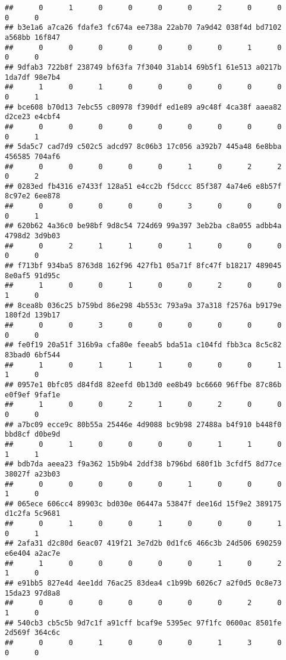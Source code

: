 \documentclass[
]{article}
\begin{document}
\begin{verbatim}
##      0      1      0      0      0      0      2      0      0      0      0 
## b3e1a6 a7ca26 fdafe3 fc674a ee738a 22ab70 7a9d42 038f4d bd7102 a568bb 16f847 
##      0      0      0      0      0      0      0      1      0      0      0 
## 9dfab3 722b8f 238749 bf63fa 7f3040 31ab14 69b5f1 61e513 a0217b 1da7df 98e7b4 
##      1      0      1      0      0      0      0      0      0      0      1 
## bce608 b70d13 7ebc55 c80978 f390df ed1e89 a9c48f 4ca38f aaea82 d2ce23 e4cbf4 
##      0      0      0      0      0      0      0      0      0      0      1 
## 5da5c7 cad7d9 c502c5 adcd97 8c06b3 17c056 a392b7 445a48 6e8bba 456585 704af6 
##      0      0      0      0      0      1      0      2      2      0      2 
## 0283ed fb4316 e7433f 128a51 e4cc2b f5dccc 85f387 4a74e6 e8b57f 8c97e2 6ee878 
##      0      0      0      0      0      3      0      0      0      0      1 
## 620b62 4a36c0 be98bf 9d8c54 724d69 99a397 3eb2ba c8a055 adbb4a 4798d2 3d9b03 
##      0      2      1      1      0      1      0      0      0      0      0 
## f713bf 934ba5 8763d8 162f96 427fb1 05a71f 8fc47f b18217 489045 8e0af5 91d95c 
##      1      0      0      1      0      0      2      0      0      1      0 
## 8cea8b 036c25 b759bd 86e298 4b553c 793a9a 37a318 f2576a b9179e 180f2d 139b17 
##      0      0      3      0      0      0      0      0      0      0      0 
## fe0f19 20a51f 316b9a cfa80e feeab5 bda51a c104fd fbb3ca 8c5c82 83bad0 6bf544 
##      1      0      1      1      1      0      0      0      1      1      0 
## 0957e1 0bfc05 d84fd8 82eefd 0b13d0 ee8b49 bc6660 96ffbe 87c86b e0f9ef 9faf1e 
##      1      0      0      2      1      0      2      0      0      0      0 
## a7bc09 ecce9c 80b55a 25446e 4d9088 bc9b98 27488a b4f910 b448f0 bbd8cf d0be9d 
##      0      1      0      0      0      0      1      1      0      1      1 
## bdb7da aeea23 f9a362 15b9b4 2ddf38 b796bd 680f1b 3cfdf5 8d77ce 38027f a23b03 
##      0      0      0      0      0      1      0      0      0      1      0 
## 065ece 606cc4 89903c bd030e 06447a 53847f dee16d 15f9e2 389175 d1c2fa 5c9681 
##      0      1      0      0      1      0      0      0      1      0      1 
## 2afa31 d2c80d 6eac07 419f21 3e7d2b 0d1fc6 466c3b 24d506 690259 e6e404 a2ac7e 
##      1      0      0      0      0      0      1      0      2      1      0 
## e91bb5 827e4d 4ee1dd 76ac25 83dea4 c1b99b 6026c7 a2f0d5 0c8e73 15da23 97d8a8 
##      0      0      0      0      0      0      0      2      0      1      0 
## 540cb3 cb5c5b 9d7c1f a91cff bcaf9e 5395ec 97f1fc 0600ac 8501fe 2d569f 364c6c 
##      0      0      1      0      0      0      1      3      0      0      0 

\end{verbatim}
\end{document}
